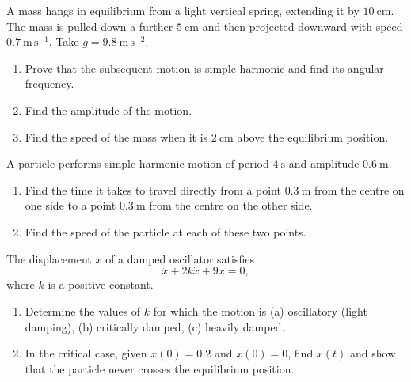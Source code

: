 \documentclass[11pt]{article}
\newcounter{popsec}
\newcounter{popsub}
\newcommand{\courssub}[1]{%
  \stepcounter{popsub}%
  \par\vspace{9pt}\noindent{\popxbold\fontsize{11.5}{13}\selectfont\color{popink}{\color{poporange}\thepopsec.\thepopsub}\hspace{6pt}#1}\par\nopagebreak\vspace{4pt}
}
\begin{document}
\begin{exercice}
A mass hangs in equilibrium from a light vertical spring, extending it by $10\ \mathrm{cm}$. The mass is pulled down a further $5\ \mathrm{cm}$ and then projected downward with speed $0.7\ \mathrm{m\,s^{-1}}$. Take $g = 9.8\ \mathrm{m\,s^{-2}}$.
\begin{enumerate}
\item Prove that the subsequent motion is simple harmonic and find its angular frequency.
\item Find the amplitude of the motion.
\item Find the speed of the mass when it is $2\ \mathrm{cm}$ above the equilibrium position.
\end{enumerate}
\end{exercice}

\begin{exercice}
A particle performs simple harmonic motion of period $4\ \mathrm{s}$ and amplitude $0.6\ \mathrm{m}$.
\begin{enumerate}
\item Find the time it takes to travel directly from a point $0.3\ \mathrm{m}$ from the centre on one side to a point $0.3\ \mathrm{m}$ from the centre on the other side.
\item Find the speed of the particle at each of these two points.
\end{enumerate}
\end{exercice}

\begin{exercice}
The displacement $x$ of a damped oscillator satisfies
\[
\ddot{x} + 2k\dot{x} + 9x = 0,
\]
where $k$ is a positive constant.
\begin{enumerate}
\item Determine the values of $k$ for which the motion is (a) oscillatory (light damping), (b) critically damped, (c) heavily damped.
\item In the critical case, given $x(0) = 0.2$ and $\dot{x}(0) = 0$, find $x(t)$ and show that the particle never crosses the equilibrium position.
\end{enumerate}
\end{exercice}

\courssub{I prepare for the GCE}
\end{document}
